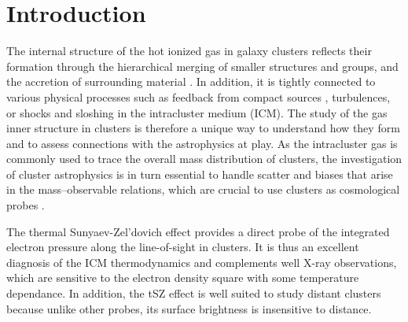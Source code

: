 \documentclass[twocolumn,traditabstract]{aa}
\begin{document}

\section{Introduction}
The internal structure of the hot ionized gas in galaxy clusters reflects their formation through the hierarchical merging of smaller structures and groups, and the accretion of surrounding material \citep{Kravtsov2012}. In addition, it is tightly connected to various physical processes such as feedback from compact sources \citep{Fabian2012}, turbulences, or shocks and sloshing \citep{Markevitch2007} in the intracluster medium (ICM). The study of the gas inner structure in clusters is therefore a unique way to understand how they form and to assess connections with the astrophysics at play. As the intracluster gas is commonly used to trace the overall mass distribution of clusters, the investigation of cluster astrophysics is in turn essential to handle scatter and biases that arise in the mass--observable relations, which are crucial to use clusters as cosmological probes \citep[see][for a review]{Allen2011}.

The thermal Sunyaev-Zel'dovich \citep[tSZ,][]{Sunyaev1972,Sunyaev1980} effect provides a direct probe of the integrated electron pressure along the line-of-sight in clusters. It is thus an excellent diagnosis of the ICM thermodynamics and complements well X-ray observations, which are sensitive to the electron density square with some temperature dependance. In addition, the tSZ effect is well suited to study distant clusters because unlike other probes, its surface brightness is insensitive to distance.
\end{document}
